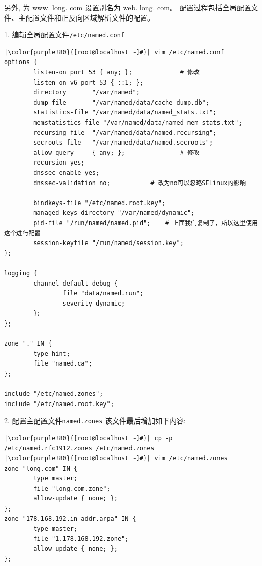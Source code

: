 另外, 为 www. long. com 设置别名为 web. long. com。
配置过程包括全局配置文件、主配置文件和正反向区域解析文件的配置。
\begin{ascboxB}{1.  编辑全局配置文件\texttt{/etc/named.conf}}
\begin{verbatim}
|\color{purple!80}{[root@localhost ~]#}| vim /etc/named.conf
options {
        listen-on port 53 { any; };             # 修改
        listen-on-v6 port 53 { ::1; };
        directory       "/var/named";
        dump-file       "/var/named/data/cache_dump.db";
        statistics-file "/var/named/data/named_stats.txt";
        memstatistics-file "/var/named/data/named_mem_stats.txt";
        recursing-file  "/var/named/data/named.recursing";
        secroots-file   "/var/named/data/named.secroots";
        allow-query     { any; };               # 修改
        recursion yes;
        dnssec-enable yes;
        dnssec-validation no;           # 改为no可以忽略SELinux的影响

        bindkeys-file "/etc/named.root.key";
        managed-keys-directory "/var/named/dynamic";
        pid-file "/run/named/named.pid";    # 上面我们复制了，所以这里使用这个进行配置
        session-keyfile "/run/named/session.key";
};

logging {
        channel default_debug {
                file "data/named.run";
                severity dynamic;
        };
};

zone "." IN {
        type hint;
        file "named.ca";
};

include "/etc/named.zones";
include "/etc/named.root.key";
\end{verbatim}
\end{ascboxB}
\begin{ascboxB}{2.  配置主配置文件\texttt{named.zones}}
\quad 该文件最后增加如下内容:
\begin{verbatim}
|\color{purple!80}{[root@localhost ~]#}| cp -p /etc/named.rfc1912.zones /etc/named.zones
|\color{purple!80}{[root@localhost ~]#}| vim /etc/named.zones
zone "long.com" IN {
        type master;
        file "long.com.zone";
        allow-update { none; };
};
zone "178.168.192.in-addr.arpa" IN {
        type master;
        file "1.178.168.192.zone";
        allow-update { none; };
};
\end{verbatim}
\end{ascboxB}
